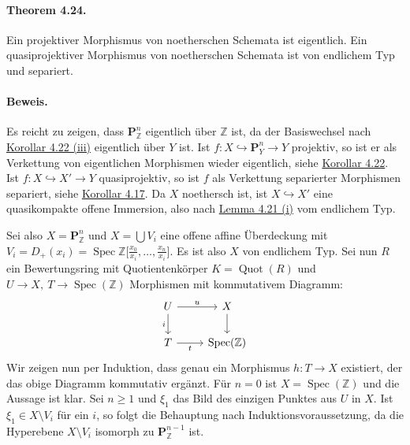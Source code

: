 \paragraph{Theorem 4.24.}\label{4.24} Ein projektiver Morphismus von noetherschen Schemata ist eigentlich. Ein quasiprojektiver Morphismus von noetherschen Schemata ist von endlichem Typ und separiert.

\paragraph{Beweis.} Es reicht zu zeigen, dass $\mathbf{P}_\mathbb{Z}^n$ eigentlich über $\mathbb{Z}$ ist, da der Basiswechsel nach \hyperref[4.22]{Korollar 4.22 (iii)} eigentlich über $Y$ ist. Ist $f:X\hookrightarrow \mathbf{P}^n_Y \to Y$ projektiv, so ist er als Verkettung von eigentlichen Morphismen wieder eigentlich, siehe \hyperref[4.22]{Korollar 4.22}. Ist $f:X\hookrightarrow X'\to Y$ quasiprojektiv, so ist $f$ als Verkettung separierter Morphismen separiert, siehe \hyperref[4.17]{Korollar 4.17}. Da $X$ noethersch ist, ist $X\hookrightarrow X'$ eine quasikompakte offene Immersion, also nach \hyperref[4.21]{Lemma 4.21 (i)} vom endlichem Typ.

Sei also $X=\mathbf{P}_\mathbb{Z}^n$ und $X=\bigcup V_i$ eine offene affine Überdeckung mit $V_i=D_+(x_i)=\operatorname{Spec}\mathbb{Z}\big[\frac{x_0}{x_i},\ldots,\frac{x_n}{x_i} \big]$. Es ist also $X$ von endlichem Typ. Sei nun $R$ ein Bewertungsring mit Quotientenkörper $K=\operatorname{Quot}(R)$ und $U\to X,\ T\to\operatorname{Spec}(\mathbb{Z})$ Morphismen mit kommutativem Diagramm:
\[\begin{tikzcd}
U\ar[r, "u"]\ar[d, "i"'] & X\ar[d]\\
T\ar[r, "t"'] & \operatorname{Spec}(\mathbb{Z})
\end{tikzcd}\]
Wir zeigen nun per Induktion, dass genau ein Morphismus $h:T\to X$ existiert, der das obige Diagramm kommutativ ergänzt. Für $n=0$ ist $X=\operatorname{Spec}(\mathbb{Z})$ und die Aussage ist klar. Sei $n\geq 1$ und $\xi_1$ das Bild des einzigen Punktes aus $U$ in $X$. Ist $\xi_1\in X\setminus V_i$ für ein $i$, so folgt die Behauptung nach Induktionsvoraussetzung, da die Hyperebene $X\setminus V_i$ isomorph zu $\mathbf{P}_\mathbb{Z}^{n-1}$ ist.

